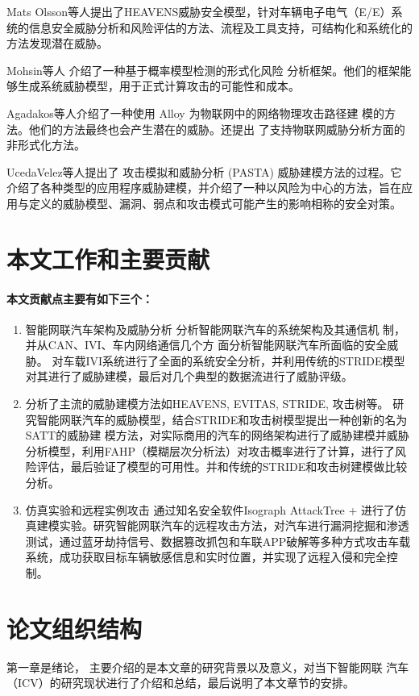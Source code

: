 Mats Olsson等人提出了HEAVENS威胁安全模型\cite{lautenbach2021proposing}，针对车辆电子电气（E/E）系统的信息安全威胁分析和风险评估的方法、流程及工具支持，可结构化和系统化的方法发现潜在威胁。

Mohsin等人\cite{mohsin2017iotriskanalyzer} 介绍了一种基于概率模型检测的形式化风险
分析框架。他们的框架能够生成系统威胁模型，用于正式计算攻击的可能性和成本。

Agadakos\cite{agadakos2017jumping}等人介绍了一种使用 Alloy 为物联网中的网络物理攻击路径建
模的方法。他们的方法最终也会产生潜在的威胁。还提出
了支持物联网威胁分析方面的非形式化方法。

UcedaVelez等人提出了\cite{ucedavelez2015risk} 攻击模拟和威胁分析 (PASTA) 威胁建模方法的过程。它介绍了各种类型的应用程序威胁建模，并介绍了一种以风险为中心的方法，旨在应用与定义的威胁模型、漏洞、弱点和攻击模式可能产生的影响相称的安全对策。 

\section{本文工作和主要贡献}
\paragraph{本文贡献点主要有如下三个：}

\begin{enumerate}
    \item 智能网联汽车架构及威胁分析 
    分析智能网联汽车的系统架构及其通信机
    制，并从CAN、IVI、车内网络通信几个方
    面分析智能网联汽车所面临的安全威胁。
    对车载IVI系统进行了全面的系统安全分析，并利用传统的STRIDE模型对其进行了威胁建模，最后对几个典型的数据流进行了威胁评级。
    \item 分析了主流的威胁建模方法如HEAVENS, EVITAS, STRIDE, 攻击树等。
    研究智能网联汽车的威胁模型，结合STRIDE和攻击树模型提出一种创新的名为SATT的威胁建
模方法，对实际商用的汽车的网络架构进行了威胁建模并威胁分析模型，利用FAHP（模糊层次分析法）对攻击概率进行了计算，进行了风险评估，最后验证了模型的可用性。并和传统的STRIDE和攻击树建模做比较分析。
    \item 仿真实验和远程实例攻击
    通过知名安全软件Isograph AttackTree + 进行了仿真建模实验。研究智能网联汽车的远程攻击方法，对汽车进行漏洞挖掘和渗透测试，通过蓝牙劫持信号、数据篡改抓包和车联APP破解等多种方式攻击车载系统，成功获取目标车辆敏感信息和实时位置，并实现了远程入侵和完全控制。
\end{enumerate}


\section{论文组织结构}
第一章是绪论， 主要介绍的是本文章的研究背景以及意义，对当下智能网联
汽车（ICV）的研究现状进行了介绍和总结，最后说明了本文章节的安排。

